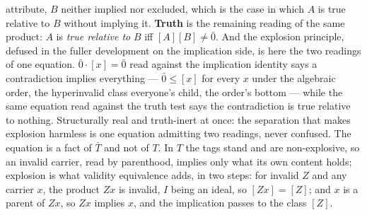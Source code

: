 attribute, $B$ neither implied nor excluded, which is the case in which $A$ is true relative to $B$ without implying it. \textbf{Truth} is the remaining reading of the same product: $A$ is \emph{true relative to} $B$ iff $[A][B] \neq \bar{0}$. And the explosion principle, defused in the fuller development on the implication side, is here the two readings of one equation. $\bar{0}\cdot[x] = \bar{0}$ read against the implication identity says a contradiction implies everything --- $\bar{0} \leq [x]$ for every $x$ under the algebraic order, the hyperinvalid class everyone's child, the order's bottom --- while the same equation read against the truth test says the contradiction is true relative to nothing. Structurally real and truth-inert at once: the separation that makes explosion harmless is one equation admitting two readings, never confused. The equation is a fact of $\bar{T}$ and not of $T$. In $T$ the tags stand and are non-explosive, so an invalid carrier, read by parenthood, implies only what its own content holds; explosion is what validity equivalence adds, in two steps: for invalid $Z$ and any carrier $x$, the product $Zx$ is invalid, $I$ being an ideal, so $[Zx] = [Z]$; and $x$ is a parent of $Zx$, so $Zx$ implies $x$, and the implication passes to the class $[Z]$.
